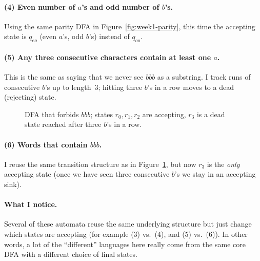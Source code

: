 \documentclass{article}
\theoremstyle{theorem}
\theoremstyle{definition}
\theoremstyle{remark}
\begin{document}
\paragraph{(4) Even number of $a$'s and odd number of $b$'s.}
Using the same parity DFA in Figure~\ref{fig:week1-parity}, this time the accepting state is $q_{eo}$ (even $a$'s, odd $b$'s) instead of $q_{oo}$.

\paragraph{(5) Any three consecutive characters contain at least one $a$.}
This is the same as saying that we never see $bbb$ as a substring. I track runs of consecutive $b$'s up to length~3; hitting three $b$'s in a row moves to a dead (rejecting) state.

\begin{figure}[H]
  \centering
  \caption{DFA that forbids $bbb$; states $r_0,r_1,r_2$ are accepting, $r_3$ is a dead state reached after three $b$'s in a row.}
  \label{fig:week1-nobbb}
\end{figure}

\paragraph{(6) Words that contain $bbb$.}
I reuse the same transition structure as in Figure~\ref{fig:week1-nobbb}, but now $r_3$ is the \emph{only} accepting state (once we have seen three consecutive $b$'s we stay in an accepting sink).

\paragraph{What I notice.}
Several of these automata reuse the same underlying structure but just change which states are accepting (for example (3) vs.\ (4), and (5) vs.\ (6)). In other words, a lot of the ``different'' languages here really come from the same core DFA with a different choice of final states.
\end{document}
